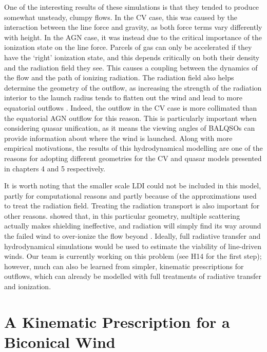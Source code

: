 One of the interesting results of these  simulations is that they tended
to produce somewhat unsteady, clumpy flows. In the CV case, this was caused by
the interaction between the line force and gravity, as both force terms vary 
differently with height. In the AGN case, it was instead due to the critical
importance of the ionization state on the line force. Parcels of gas can only 
be accelerated if they have the `right' ionization state, and this depends
critically on both their density and the radiation field they see. This causes
a coupling between the dynamics of the flow and the path of ionizing radiation. 
The radiation field also helps
determine the geometry of the outflow, as increasing the strength of the radiation
interior to the launch radius tends to flatten out the wind and lead to more
equatorial outflows \citep{proga1998,proga2005}. Indeed, the outflow 
in the CV case is more collimated than the equatorial AGN outflow for this reason.
This is particularly important when considering quasar unification, as it means
the viewing angles of BALQSOs can provide information about where the wind is launched.
Along with more empirical motivations, the results of this hydrodynamical modelling
are one of the reasons for adopting different geometries for the CV and quasar 
models presented in chapters 4 and 5 respectively.

It is worth noting that the smaller scale LDI could not be included in this model,
partly for computational reasons and partly because of the approximations 
used to treat the radiation field. Treating the radiation transport is also
important for other reasons. 
\citet[][hereafter H14]{H14} showed that, in this particular geometry, 
multiple scattering actually makes shielding
ineffective, and radiation will simply find its way around the failed wind
to over-ionize the flow beyond \citep[see also][]{sim2010_hydro}.
Ideally, full radiative transfer and hydrodynamical simulations would be used
to estimate the viability of line-driven winds. Our team is currently working 
on this problem (see H14 for the first step); however, much 
can also be learned from simpler, kinematic prescriptions for outflows, which can
already be modelled with full treatments of radiative transfer and ionization.  

\section{A Kinematic Prescription for a Biconical Wind}
\label{sec:sv93_model}

